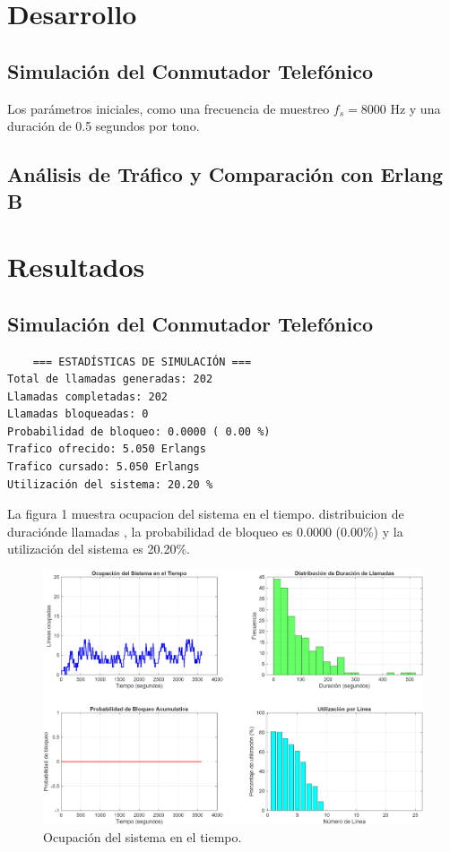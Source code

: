 \documentclass[journal]{IEEEtran} %
\begin{document}
\section{Desarrollo}

\subsection{Simulación del Conmutador Telefónico}\label{AA}
Los parámetros iniciales, como una frecuencia de muestreo $f_s=8000$ Hz y una duración de 0.5 segundos por tono.


\subsection{Análisis de Tráfico y Comparación con Erlang B}



\section{Resultados}
\subsection{Simulación del Conmutador Telefónico}\label{AA}

\begin{verbatim}
    === ESTADÍSTICAS DE SIMULACIÓN ===
Total de llamadas generadas: 202
Llamadas completadas: 202
Llamadas bloqueadas: 0
Probabilidad de bloqueo: 0.0000 ( 0.00 %)
Trafico ofrecido: 5.050 Erlangs
Trafico cursado: 5.050 Erlangs
Utilización del sistema: 20.20 % 

\end{verbatim}

La figura 1  muestra ocupacion del sistema en el tiempo. distribuicion de duraciónde llamadas , la probabilidad de bloqueo es 0.0000 (0.00\%) y la utilización del sistema es 20.20\%.
 \begin{figure}[H]
     \centerline{\includegraphics[width=0.8\columnwidth]{Figure_1.png}}
     \caption{ Ocupación del sistema en el tiempo.}
     \label{fig}
 \end{figure}
\end{document}
